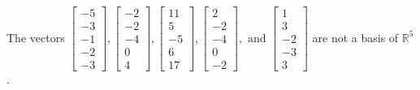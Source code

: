 \begin{exercise}
\begin{exerciseStatement}
  \end{exerciseStatement}
  \begin{exerciseAnswer}
   The vectors \(\left[\begin{array}{r}
-5 \\
-3 \\
-1 \\
-2 \\
-3
\end{array}\right] , \left[\begin{array}{r}
-2 \\
-2 \\
-4 \\
0 \\
4
\end{array}\right] , \left[\begin{array}{r}
11 \\
5 \\
-5 \\
6 \\
17
\end{array}\right] , \left[\begin{array}{r}
2 \\
-2 \\
-4 \\
0 \\
-2
\end{array}\right] , \text{ and } \left[\begin{array}{r}
1 \\
3 \\
-2 \\
-3 \\
3
\end{array}\right]\) 
  	 are not  a basis of \(\mathbb{R}^5\).
  


  \end{exerciseAnswer}
\end{exercise}